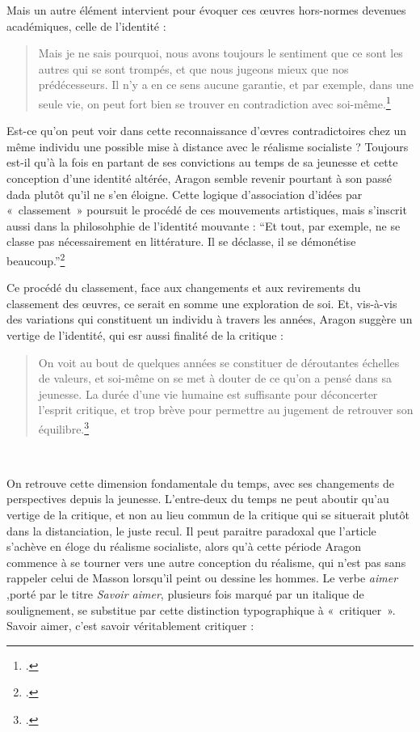  Mais un autre élément intervient pour évoquer ces \oe{}uvres hors-normes devenues académiques, celle de l’identité :  
 \begin{quote}
  Mais je ne sais pourquoi, nous avons toujours le sentiment que ce sont les autres qui se sont trompés, et que nous jugeons mieux que nos prédécesseurs. Il n’y a en ce sens aucune garantie, et par exemple, dans une seule vie, on peut fort bien se trouver en contradiction avec soi-même.\footcite{savoiraimer}\end{quote}

	Est-ce qu’on peut voir dans cette reconnaissance d’\oe{}vres contradictoires chez un même individu une possible mise à distance avec le réalisme socialiste ? Toujours est-il qu’à la fois en partant de ses convictions au temps de sa jeunesse et cette conception d’une identité altérée, Aragon semble revenir pourtant à son passé dada plutôt qu’il ne s’en éloigne. Cette logique d'association d'idées par  « classement » poursuit le procédé de ces mouvements artistiques, mais s'inscrit aussi dans la philosohphie de l'identité mouvante : \enquote{Et tout, par exemple, ne se classe pas nécessairement en littérature. Il se déclasse, il se démonétise beaucoup.}\footcite{savoiraimer}

Ce procédé du classement, face aux changements et aux revirements du  classement des \oe{}uvres, ce serait en somme une exploration de soi. Et, vis-à-vis des variations qui constituent un individu à travers les années,  Aragon suggère un vertige de l’identité, qui esr aussi finalité de la critique : 

\begin{quote}
 On voit au bout de quelques années se constituer de déroutantes échelles de valeurs, et soi-même on se met à douter de ce qu’on a pensé dans sa jeunesse. La durée d’une vie humaine est suffisante pour déconcerter l’esprit critique, et trop brève pour permettre au jugement de retrouver son équilibre.\footcite{savoiraimer}   
\end{quote}
 

	 On retrouve cette dimension fondamentale du temps, avec ses changements de perspectives depuis la jeunesse. L’entre-deux du temps ne peut aboutir qu’au vertige de la critique, et non au lieu commun de la critique qui se situerait plutôt dans la distanciation, le juste recul. Il peut paraitre paradoxal que l’article s’achève en éloge du réalisme socialiste, alors qu’à cette période Aragon commence à se tourner vers une autre conception du réalisme, qui n’est pas sans rappeler celui de Masson lorsqu’il peint ou dessine les hommes. Le verbe \emph{aimer} ,porté par le titre \emph{Savoir aimer},  plusieurs fois marqué par un italique de soulignement, se substitue par cette distinction typographique à « critiquer ». Savoir aimer, c’est savoir véritablement critiquer :  

